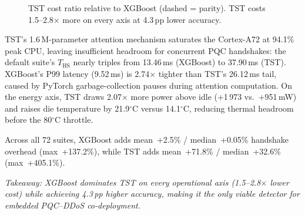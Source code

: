 \begin{figure}[t]
\centering
{}%
\caption{TST cost ratio relative to XGBoost (dashed = parity).
  TST costs 1.5--2.8$\times$ more on every axis at 4.3\,pp
  lower accuracy.}
\label{fig:detector_ratio}
\end{figure}

TST's 1.6\,M-parameter attention mechanism saturates the
Cortex-A72 at 94.1\% peak CPU, leaving insufficient headroom
for concurrent PQC handshakes: the default suite's $T_\text{HS}$
nearly triples from 13.46\,ms (XGBoost) to 37.90\,ms (TST).
XGBoost's P99 latency (9.52\,ms) is 2.74$\times$ tighter than
TST's 26.12\,ms tail, caused by PyTorch garbage-collection pauses
during attention computation.  On the energy axis, TST draws
2.07$\times$ more power above idle (+1\,973 vs.\ +951\,mW) and
raises die temperature by 21.9$^\circ$C versus 14.1$^\circ$C,
reducing thermal headroom before the 80$^\circ$C throttle.

Across all 72 suites, XGBoost adds mean~+2.5\% / median~+0.05\%
handshake overhead (max~+137.2\%), while TST adds
mean~+71.8\% / median~+32.6\% (max~+405.1\%).

\emph{Takeaway: XGBoost dominates TST on every operational axis
(1.5--2.8$\times$ lower cost) while achieving 4.3\,pp higher
accuracy, making it the only viable detector for embedded
PQC--DDoS co-deployment.}

